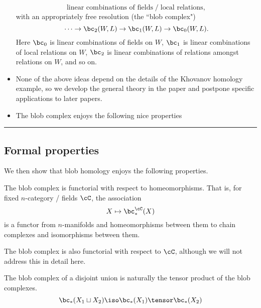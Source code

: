 \begin{itemize}
\[
 \text{linear combinations of fields} \;\big/\; \text{local relations} ,
\]
with an appropriately free resolution (the ``blob complex")
\[
	\cdots\to \bc_2(W, L) \to \bc_1(W, L) \to \bc_0(W, L) .
\]
Here $\bc_0$ is linear combinations of fields on $W$,
$\bc_1$ is linear combinations of local relations on $W$,
$\bc_2$ is linear combinations of relations amongst relations on $W$,
and so on.
\item None of the above ideas depend on the details of the Khovanov homology example,
so we develop the general theory in the paper and postpone specific applications
to later papers.
\item The blob complex enjoys the following nice properties 
\end{itemize}

\bigskip
\hrule
\bigskip

\subsection{Formal properties}
\label{sec:properties}
We then show that blob homology enjoys the following properties.

\begin{property}[Functoriality]
\label{property:functoriality}%
The blob complex is functorial with respect to homeomorphisms. That is, 
for fixed $n$-category / fields $\cC$, the association
\begin{equation*}
X \mapsto \bc_*^{\cC}(X)
\end{equation*}
is a functor from $n$-manifolds and homeomorphisms between them to chain complexes and isomorphisms between them.
\end{property}

The blob complex is also functorial with respect to $\cC$, although we will not address this in detail here.

\begin{property}
\label{property:disjoint-union}
The blob complex of a disjoint union is naturally the tensor product of the blob complexes.
\begin{equation*}
\bc_*(X_1 \du X_2) \iso \bc_*(X_1) \tensor \bc_*(X_2)
\end{equation*}
\end{property}

